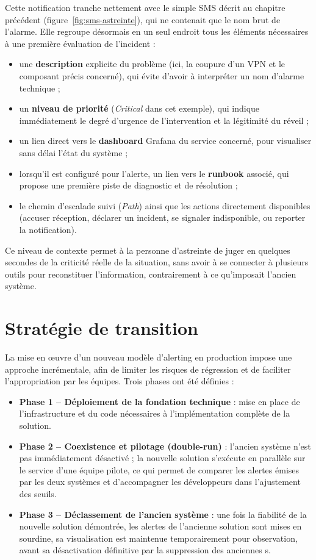 Cette notification tranche nettement avec le simple SMS décrit au chapitre précédent
(figure~\ref{fig:sms-astreinte}), qui ne contenait que le nom brut de l'alarme. Elle regroupe désormais
en un seul endroit tous les éléments nécessaires à une première évaluation de l'incident :

\begin{itemize}
	\item une \textbf{description} explicite du problème (ici, la coupure d'un VPN et le composant précis concerné), qui évite d'avoir à interpréter un nom d'alarme technique ;
	\item un \textbf{niveau de priorité} (\emph{Critical} dans cet exemple), qui indique immédiatement le degré d'urgence de l'intervention et la légitimité du réveil ;
	\item un lien direct vers le \textbf{dashboard} Grafana du service concerné, pour visualiser sans délai l'état du système ;
	\item lorsqu'il est configuré pour l'alerte, un lien vers le \textbf{runbook} associé, qui propose une première piste de diagnostic et de résolution ;
	\item le chemin d'escalade suivi (\emph{Path}) ainsi que les actions directement disponibles (accuser réception, déclarer un incident, se signaler indisponible, ou reporter la notification).
\end{itemize}

Ce niveau de contexte permet à la personne d'astreinte de juger en quelques secondes de la criticité
réelle de la situation, sans avoir à se connecter à plusieurs outils pour reconstituer l'information,
contrairement à ce qu'imposait l'ancien système.

\section{Stratégie de transition}

La mise en œuvre d'un nouveau modèle d'alerting en production impose une approche incrémentale,
afin de limiter les risques de régression et de faciliter l'appropriation par les équipes. Trois phases ont
été définies :

\begin{itemize}
	\item \textbf{Phase 1 -- Déploiement de la fondation technique} : mise en place de l'infrastructure et du code nécessaires à l'implémentation complète de la solution.
	\item \textbf{Phase 2 -- Coexistence et pilotage (double-run)} : l'ancien système n'est pas immédiatement désactivé ; la nouvelle solution s'exécute en parallèle sur le service d'une équipe pilote, ce qui permet de comparer les alertes émises par les deux systèmes et d'accompagner les développeurs dans l'ajustement des seuils.
	\item \textbf{Phase 3 -- Déclassement de l'ancien système} : une fois la fiabilité de la nouvelle solution démontrée, les alertes de l'ancienne solution sont mises en sourdine, sa visualisation est maintenue temporairement pour observation, avant sa désactivation définitive par la suppression des anciennes s.
\end{itemize}

